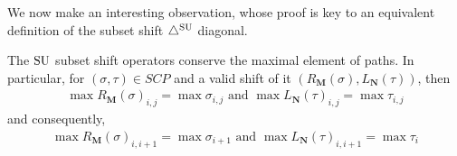 We now make an interesting observation, whose proof is key to an equivalent definition of the subset shift $\triangle^{\mathrm{SU}}$ diagonal. 
\begin{lemma} \label{lem:SU subset conserves maximal element of paths}
The $\mathrm{SU}$ subset shift operators conserve the maximal element of paths.
In particular, for $(\sigma,\tau)\in SCP$ and a valid shift of it $(R_{\mathbf{M}}(\sigma),L_{\mathbf{N}}(\tau))$, then
\begin{align*}
    \max R_{\mathbf{M}}(\sigma)_{i,j} = \max \sigma_{i,j} \text{ and } \max L_{\mathbf{N}}(\tau)_{i,j} = \max \tau_{i,j}
\end{align*}
and consequently,
\begin{align*}
    \max R_{\mathbf{M}}(\sigma)_{i,i+1} = \max \sigma_{i+1} \text{ and } \max L_{\mathbf{N}}(\tau)_{i,i+1} = \max \tau_{i} 
\end{align*}
\end{lemma}

